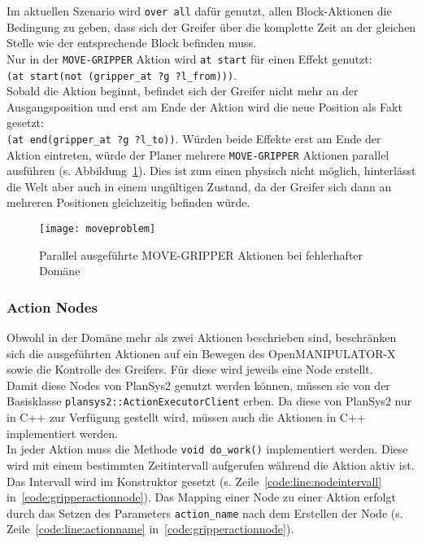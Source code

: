 Im aktuellen Szenario wird \verb|over all| dafür genutzt, allen Block-Aktionen die Bedingung zu geben, dass sich der Greifer über die komplette Zeit an der gleichen Stelle wie der entsprechende Block befinden muss.\\
Nur in der \verb|MOVE-GRIPPER| Aktion wird \verb|at start| für einen Effekt genutzt:\\
\verb|(at start(not (gripper_at ?g ?l_from)))|.\\
Sobald die Aktion beginnt, befindet sich der Greifer nicht mehr an der Ausgangsposition und erst am Ende der Aktion wird die neue Position als Fakt gesetzt:\\
\verb|(at end(gripper_at ?g ?l_to))|.
Würden beide Effekte erst am Ende der Aktion eintreten, würde der Planer mehrere \verb|MOVE-GRIPPER| Aktionen parallel ausführen (s. Abbildung~\ref{fig:tempgrippereffect}).
Dies ist zum einen physisch nicht möglich, hinterlässt die Welt aber auch in einem ungültigen Zustand, da der Greifer sich dann an mehreren Positionen gleichzeitig befinden würde.
\begin{figure}[ht!]
    \centering
    \texttt{[image: moveproblem]}
    \caption{Parallel ausgeführte MOVE-GRIPPER Aktionen bei fehlerhafter Domäne}
    \label{fig:tempgrippereffect}
\end{figure}

\subsubsection{Action Nodes}
Obwohl in der Domäne mehr als zwei Aktionen beschrieben sind, beschränken sich die ausgeführten Aktionen auf ein Bewegen des OpenMANIPULATOR-X sowie die Kontrolle des Greifers.
Für diese wird jeweils eine Node erstellt.\\
Damit diese Nodes von \ac{PlanSys2} genutzt werden können, müssen sie von der Basisklasse \verb|plansys2::ActionExecutorClient| erben.
Da diese von \ac{PlanSys2} nur in C++ zur Verfügung gestellt wird, müssen auch die Aktionen in C++ implementiert werden.\\
In jeder Aktion muss die Methode \verb|void do_work()| implementiert werden.
Diese wird mit einem bestimmten Zeitintervall aufgerufen während die Aktion aktiv ist.
Das Intervall wird im Konstruktor gesetzt (s. Zeile~\ref{code:line:nodeintervall} in~\ref{code:gripperactionnode}).
Das Mapping einer Node zu einer Aktion erfolgt durch das Setzen des Parameters \verb|action_name| nach dem Erstellen der Node (s. Zeile~\ref{code:line:actionname} in~\ref{code:gripperactionnode}).

